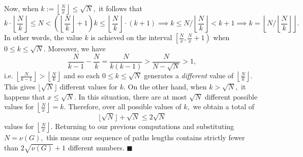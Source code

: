 \documentclass{article}
\begin{document}
  Now, when $k:=\left\lfloor \frac{N}{x}\right\rfloor \leq \sqrt{N},$ it follows that $$k\cdot \left\lfloor \frac{N}{k}\right\rfloor\leq N<\left(\left\lfloor \frac{N}{k}\right\rfloor+1\right)k\leq \left\lfloor \frac{N}{k}\right\rfloor\cdot (k+1)\implies k\leq N/\left\lfloor \frac{N}{k}\right\rfloor<k+1\implies k=\left\lfloor N/\left\lfloor \frac{N}{k}\right\rfloor\right\rfloor.$$In other words, the value $k$ is achieved on the interval $\left[\frac{N}{x},\frac{N}{x}+1\right)$ when $0\leq k\leq \sqrt{N}.$ Moreover, we have
  $$\frac{N}{k-1}-\frac{N}{k}=\frac{N}{k(k-1)}>\frac{N}{N-\sqrt{N}}>1,$$i.e. $\left\lfloor \frac{N}{k-1}\right\rfloor >\left\lfloor \frac{N}{k}\right\rfloor$ and so each $0\leq k\leq \sqrt{N}$ generates  a \textit{different} value of $\left\lfloor \frac{N}{k}\right\rfloor.$ This gives $\lfloor \sqrt{N}\rfloor$ different values for $k$. On the other hand, when $k>\sqrt{N},$ it happens that $x\leq \sqrt{N}.$ In this situation, there are at most $\sqrt{N}$ different possible values for $\left\lfloor \frac{N}{x}\right\rfloor=k.$ Therefore, over all possible values of $k,$ we obtain a total of $$\lfloor \sqrt{N}\rfloor +\sqrt{N}\leq 2\sqrt{N}$$values for $\left\lfloor \frac{N}{x}\right\rfloor.$ Returning to our previous computations and substituting $N=\nu(G),$ this means our sequence of paths lengths contains strictly fewer than $2\sqrt{\nu(G)}+1$ different numbers. $\blacksquare$





\end{document}
